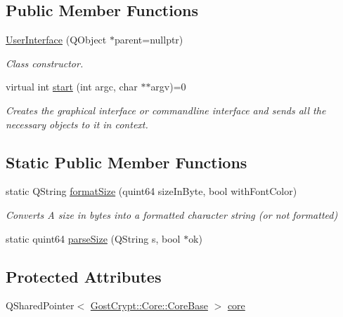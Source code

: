 \subsection*{Public Member Functions}
\begin{DoxyCompactItemize}
\item 
\hyperlink{class_user_interface_a3e519cfcb1269400ded0b51fd69e1542}{User\+Interface} (Q\+Object $\ast$parent=nullptr)
\begin{DoxyCompactList}\small\item\em Class constructor. \end{DoxyCompactList}\item 
virtual int \hyperlink{class_user_interface_a4f637eb516dc7dc59cbfba43b85a81ff}{start} (int argc, char $\ast$$\ast$argv)=0
\begin{DoxyCompactList}\small\item\em Creates the graphical interface or commandline interface and sends all the necessary objects to it in context. \end{DoxyCompactList}\end{DoxyCompactItemize}
\subsection*{Static Public Member Functions}
\begin{DoxyCompactItemize}
\item 
static Q\+String \hyperlink{class_user_interface_a13152dbf2515f9fd06d8657a2df17686}{format\+Size} (quint64 size\+In\+Byte, bool with\+Font\+Color)
\begin{DoxyCompactList}\small\item\em Converts A size in bytes into a formatted character string (or not formatted) \end{DoxyCompactList}\item 
static quint64 \hyperlink{class_user_interface_ae9e59c9a5fb9c71ab9897da2027dd3b3}{parse\+Size} (Q\+String s, bool $\ast$ok)
\end{DoxyCompactItemize}
\subsection*{Protected Attributes}
\begin{DoxyCompactItemize}
\item 
Q\+Shared\+Pointer$<$ \hyperlink{class_gost_crypt_1_1_core_1_1_core_base}{Gost\+Crypt\+::\+Core\+::\+Core\+Base} $>$ \hyperlink{class_user_interface_ae48820f0f4d47821a1c7ed9e070a26a7}{core}
\end{DoxyCompactItemize}


